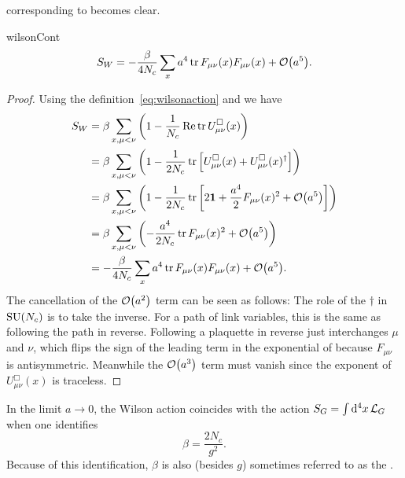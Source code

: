 corresponding to  becomes clear.
\begin{proposition}{}{wilsonCont} 
  $$S_W=-\frac{\beta}{4N_c}\sum_x a^4\tr F_{\mu\nu}(x)F_{\mu\nu}(x)
                  +\order{a^5}.$$
  \begin{proof} Using the definition~\eqref{eq:wilsonaction} and
     we have
    \begin{equation*}
    \begin{aligned}
      S_W&=\beta\sum_{x,\mu<\nu}\left(1-\frac{1}{N_c}\Re\tr 
            U_{\mu\nu}^\Box(x)\right)\\
         &=\beta\sum_{x,\mu<\nu}\left(1-\frac{1}{2N_c}\tr 
            \left[U_{\mu\nu}^\Box(x)+
            U_{\mu\nu}^\Box(x)^\dagger\right]\right)\\
         &=\beta\sum_{x,\mu<\nu}\left(1-\frac{1}{2N_c}\tr
            \left[2\id+\frac{a^4}{2}F_{\mu\nu}(x)^2
                  +\order{a^5}\right]\right)\\
         &=\beta\sum_{x,\mu<\nu}\left(-\frac{a^4}{2N_c}\tr F_{\mu\nu}(x)^2
                  +\order{a^5}\right)\\
         &=-\frac{\beta}{4N_c}\sum_x a^4\tr F_{\mu\nu}(x)F_{\mu\nu}(x)
                  +\order{a^5}.
    \end{aligned}
    \end{equation*}
    The cancellation of the $\order{a^2}$ term can be seen
    as follows: The role of the $\dagger$ in $\operatorname{SU}(N_c)$ is to take the inverse.
    For a path of link variables, this is the same as following the path
    in reverse.
    Following a plaquette in reverse just interchanges $\mu$ and $\nu$,
    which flips the sign of the leading term in the exponential
    of  because $F_{\mu\nu}$
    is antisymmetric. Meanwhile the $\order{a^3}$ term must vanish
    since the exponent of $U_{\mu\nu}^\Box(x)$ is traceless. 
  \end{proof}
\end{proposition}

In the limit $a\to0$, the Wilson action coincides with the action
$S_G=\int \dd^4x\,\mathcal{L}_G$ when one identifies 
\begin{equation}
  \beta=\frac{2N_c}{g^2}.
\end{equation}
Because of this identification, $\beta$ is also (besides $g$) sometimes 
referred to as the .

